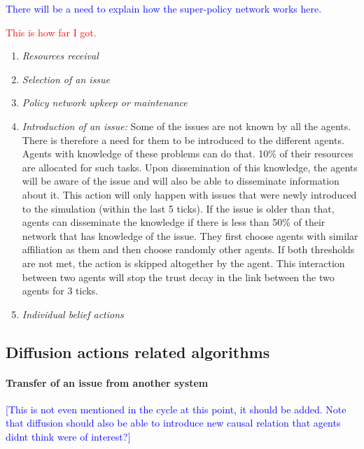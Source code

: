 \textcolor{blue}{There will be a need to explain how the super-policy network works here.}

\textcolor{red}{This is how far I got.}






\begin{enumerate}
\item \emph{Resources receival}

\item \emph{Selection of an issue}

\item \emph{Policy network upkeep or maintenance}

\item \emph{Introduction of an issue:} Some of the issues are not known by all the agents. There is therefore a need for them to be introduced to the different agents. Agents with knowledge of these problems can do that. 10\% of their resources are allocated for such tasks. Upon dissemination of this knowledge, the agents will be aware of the issue and will also be able to disseminate information about it. This action will only happen with issues that were newly introduced to the simulation (within the last 5 ticks). If the issue is older than that, agents can disseminate the knowledge if there is less than 50\% of their network that has knowledge of the issue. They first choose agents with similar affiliation as them and then choose randomly other agents. If both thresholds are not met, the action is skipped altogether by the agent. This interaction between two agents will stop the trust decay in the link between the two agents for 3 ticks.

\item \emph{Individual belief actions}

\end{enumerate}


\subsection{Diffusion actions related algorithms}

\paragraph{Transfer of an issue from another system}

\textcolor{blue}{[This is not even mentioned in the cycle at this point, it should be added. Note that diffusion should also be able to introduce new causal relation that agents didnt think were of interest?]}

